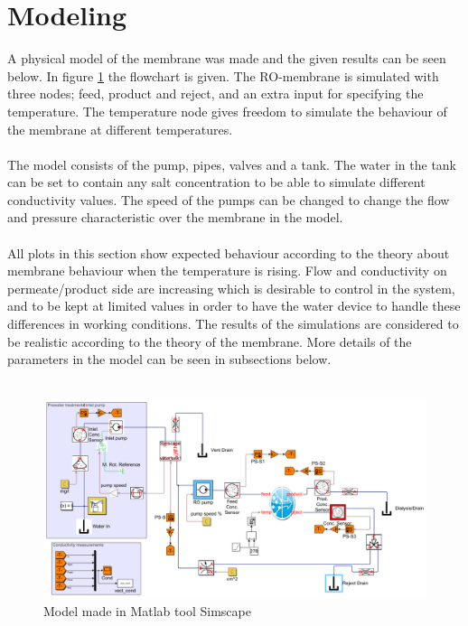 \section{Modeling}
\label{sec:modres}
A physical model of the membrane was made and the given results can be seen below. In figure \ref{fig:simscape} the flowchart is given. The RO-membrane is simulated with three nodes; feed, product and reject, and an extra input for specifying the temperature. The temperature node gives freedom to simulate the behaviour of the membrane at different temperatures. \\
\\
The model consists of the pump, pipes, valves and a tank. The water in the tank can be set to contain any salt concentration to be able to simulate different conductivity values. The speed of the pumps can be changed to change the flow and pressure characteristic over the membrane in the model. \\
\\
All plots in this section show expected behaviour according to the theory about membrane behaviour when the temperature is rising. Flow and conductivity on permeate/product side are increasing which is desirable to control in the system, and to be kept at limited values in order to have the water device to handle these differences in working conditions. The results of the simulations are considered to be realistic according to the theory of the membrane. More details of the parameters in the model can be  seen in subsections below.\\
\\
\begin{figure}[h]
\label{fig:simscape}
\centering
\includegraphics[width=\textwidth]{simscape_fc1.PNG}
\caption{Model made in Matlab tool Simscape }
\end{figure}
\newpage


